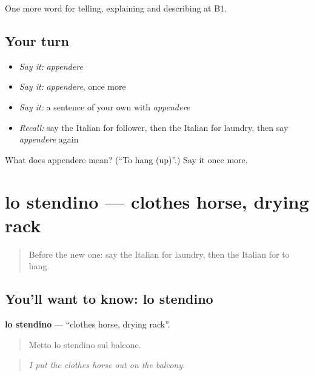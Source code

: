 \begin{grammarlens}[title={What you've built}]
One more word for telling, explaining and describing at B1.
\end{grammarlens}

\subsection*{Your turn}
\begin{itemize}
\raggedright
  \item \emph{Say it:} \emph{appendere}
  \item \emph{Say it:} \emph{appendere}, once more
  \item \emph{Say it:} a sentence of your own with \emph{appendere}
  \item \emph{Recall:} say the Italian for follower, then the Italian for laundry, then say \emph{appendere} again
\end{itemize}

\begin{tcolorbox}[breakable,colback=teal!4,colframe=teal!35!black,title={Before you move on}]
What does appendere mean? (\textquotedblleft{}To hang (up)\textquotedblright{}.) Say it once more.
\end{tcolorbox}
\section[lo stendino]{lo stendino — clothes horse, drying rack}

\label{lesson:IT-C531-stendino}



\begin{quote}
Before the new one: say the Italian for laundry, then the Italian for to hang.
\end{quote}

\subsection*{You'll want to know: lo stendino}
\textbf{lo stendino} — \textquotedblleft{}clothes horse, drying rack\textquotedblright{}.

\begin{quote}
Metto lo stendino sul balcone.
\end{quote}

\begin{quote}
\emph{I put the clothes horse out on the balcony.}
\end{quote}


